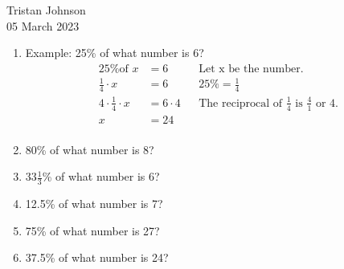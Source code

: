 \documentclass[14pt]{extarticle} %
\begin{document}
\hfill Tristan Johnson\\
\null\hfill 05 March 2023

\vspace{10mm}

\begin{enumerate}[label=\Alph*.), itemsep=\fill]
    \item Example: 25\% of what number is 6?
        \begin{align*} 
            \text{25\% of } x &= 6 && \text{Let x be the number.}\\[1em]
            \frac{1}{4} \cdot x &= 6 && 25\% = \frac{1}{4}\\[1em]
            4 \cdot \frac{1}{4} \cdot x &= 6 \cdot 4 && \text{The reciprocal of $\frac{1}{4}$ is $\frac{4}{1}$ or 4.}\\[1em]
            x &= 24\\[1em]
        \end{align*}
    \item 80\% of what number is 8?
    \item $33\frac{1}{3}$\% of what number is 6?
\vfill\clearpage
    \item 12.5\% of what number is 7?
    \item 75\% of what number is 27?
    \item 37.5\% of what number is 24?
\vfill\end{enumerate}
\end{document}
